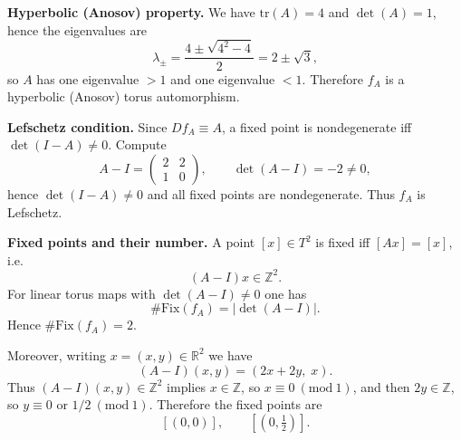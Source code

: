 \begin{solution}
\medskip
\noindent\textbf{Hyperbolic (Anosov) property.}
We have $\mathrm{tr}(A)=4$ and $\det(A)=1$, hence the eigenvalues are
\[
\lambda_{\pm}=\frac{4\pm\sqrt{4^2-4}}{2}=2\pm\sqrt{3},
\]
so $A$ has one eigenvalue $>1$ and one eigenvalue $<1$.
Therefore $f_A$ is a hyperbolic (Anosov) torus automorphism.

\medskip
\noindent\textbf{Lefschetz condition.}
Since $Df_A\equiv A$, a fixed point is nondegenerate iff $\det(I-A)\neq 0$.
Compute
\[
A-I=\begin{pmatrix}2&2\\1&0\end{pmatrix},
\qquad
\det(A-I) = -2\neq 0,
\]
hence $\det(I-A)\neq 0$ and all fixed points are nondegenerate. Thus $f_A$ is Lefschetz.

\medskip
\noindent\textbf{Fixed points and their number.}
A point $[x]\in T^2$ is fixed iff $[Ax]=[x]$, i.e.
\[
(A-I)x\in \mathbb{Z}^2.
\]
For linear torus maps with $\det(A-I)\neq 0$ one has
\[
\#\mathrm{Fix}(f_A)=|\det(A-I)|.
\]
Hence $\#\mathrm{Fix}(f_A)=2$.

Moreover, writing $x=(x,y)\in\mathbb{R}^2$ we have
\[
(A-I)(x,y)=(2x+2y,\; x).
\]
Thus $(A-I)(x,y)\in\mathbb{Z}^2$ implies $x\in\mathbb{Z}$, so $x\equiv 0\ (\mathrm{mod}\ 1)$, and then
$2y\in\mathbb{Z}$, so $y\equiv 0$ or $1/2\ (\mathrm{mod}\ 1)$.
Therefore the fixed points are
\[
[(0,0)],\qquad \left[(0,\tfrac12)\right].
\]
\end{solution}

